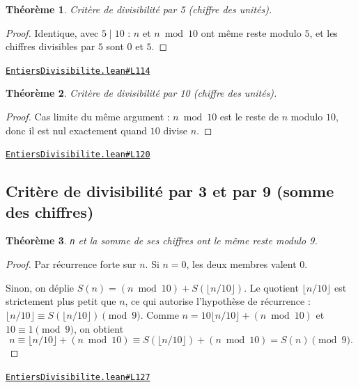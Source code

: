 \documentclass[11pt,a4paper]{article}
\theoremstyle{definition}
\theoremstyle{plain}
\newtheorem{theoreme}{Théorème}
\newcommand{\source}[2]{\par\smallskip\noindent\hfill{\footnotesize\href{#1}{\texttt{#2}}}\par\smallskip}
\begin{document}
\begin{theoreme}
Critère de divisibilité par 5 (chiffre des unités).
\end{theoreme}

\begin{proof}
Identique, avec $5 \mid 10$ : $n$ et $n \bmod 10$ ont même reste modulo $5$, et les
chiffres divisibles par $5$ sont $0$ et $5$.
\end{proof}
\source{https://github.com/Commutator-IO/learn-lean/blob/main/courses/01-college/01-nombres-et-calculs/EntiersDivisibilite.lean\#L114}{EntiersDivisibilite.lean\#L114}

\begin{theoreme}
Critère de divisibilité par 10 (chiffre des unités).
\end{theoreme}

\begin{proof}
Cas limite du même argument : $n \bmod 10$ est le reste de $n$ modulo $10$, donc il est
nul exactement quand $10$ divise $n$.
\end{proof}
\source{https://github.com/Commutator-IO/learn-lean/blob/main/courses/01-college/01-nombres-et-calculs/EntiersDivisibilite.lean\#L120}{EntiersDivisibilite.lean\#L120}

\subsection{Critère de divisibilité par 3 et par 9 (somme des chiffres)}

\begin{theoreme}
\texttt{n} et la somme de ses chiffres ont le même reste modulo 9.
\end{theoreme}

\begin{proof}
Par récurrence forte sur $n$. Si $n = 0$, les deux membres valent $0$.

Sinon, on déplie $S(n) = (n \bmod 10) + S(\lfloor n/10 \rfloor)$. Le quotient
$\lfloor n/10 \rfloor$ est strictement plus petit que $n$, ce qui autorise l'hypothèse de
récurrence : $\lfloor n/10 \rfloor \equiv S(\lfloor n/10 \rfloor) \pmod 9$. Comme
$n = 10\lfloor n/10 \rfloor + (n \bmod 10)$ et $10 \equiv 1 \pmod 9$, on obtient
\[
n \equiv \lfloor n/10 \rfloor + (n \bmod 10)
  \equiv S(\lfloor n/10 \rfloor) + (n \bmod 10) = S(n) \pmod 9 .
\]
\end{proof}
\source{https://github.com/Commutator-IO/learn-lean/blob/main/courses/01-college/01-nombres-et-calculs/EntiersDivisibilite.lean\#L127}{EntiersDivisibilite.lean\#L127}
\end{document}
